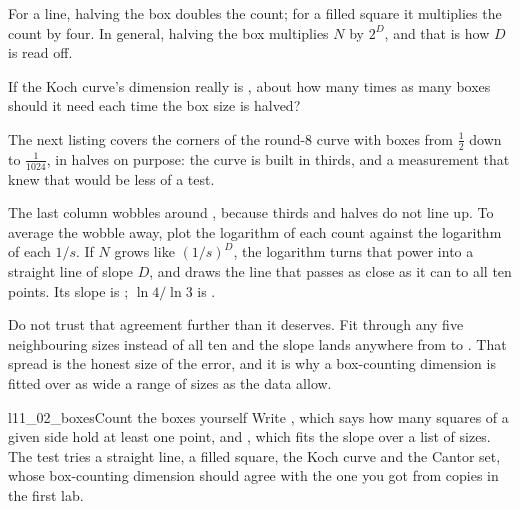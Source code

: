 
\noindent
For a line, halving the box doubles the count; for a filled square it
multiplies the count by four. In general, halving the box multiplies $N$ by
$2^{D}$, and that is how $D$ is read off.

\begin{think}
If the Koch curve's dimension really is , about how many
times as many boxes should it need each time the box size is halved?
\end{think}
The next listing covers the  corners of the round-$8$
curve with boxes from $\tfrac{1}{2}$ down to $\tfrac{1}{1024}$, in halves on
purpose: the curve is built in thirds, and a measurement that knew that
would be less of a test.



\noindent
The last column wobbles around
, because thirds and halves do not line up. To average
the wobble away, plot the logarithm of each count against the logarithm of
each $1/s$. If $N$ grows like $(1/s)^{D}$, the logarithm turns that power
into a straight line of slope $D$, and  draws the line that
passes as close as it can to all ten points. Its slope is
; $\ln 4 / \ln 3$ is .

Do not trust that agreement further than it deserves. Fit through any five
neighbouring sizes instead of all ten and the slope lands anywhere from
 to . That spread is the
honest size of the error, and it is why a box-counting dimension is fitted
over as wide a range of sizes as the data allow.

\begin{lab}{l11_02_boxes}{Count the boxes yourself}
Write , which says how many squares of a given side hold at
least one point, and , which fits the slope over a list
of sizes. The test tries a straight line, a filled square, the Koch curve and
the Cantor set, whose box-counting dimension should agree with the one you
got from copies in the first lab.
\end{lab}

